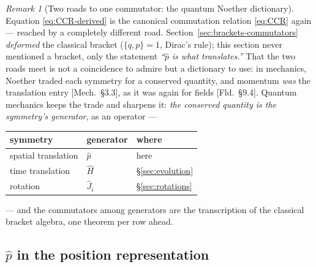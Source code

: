 \documentclass[11pt]{article}
\theoremstyle{plain}
\theoremstyle{definition}
\theoremstyle{remark}
\newtheorem{remark}[theorem]{Remark}
\newcommand{\op}[1]{\hat{#1}}
\begin{document}
\begin{remark}[Two roads to one commutator: the quantum Noether
dictionary]\label{rem:quantum-noether}
Equation \eqref{eq:CCR-derived} is the canonical commutation
relation \eqref{eq:CCR} again --- reached by a completely different
road. Section~\ref{sec:brackets-commutators} \emph{deformed} the
classical bracket ($\{q, p\} = 1$, Dirac's rule); this section never
mentioned a bracket, only the statement \emph{``$\op p$ is what
translates.''} That the two roads meet is not a coincidence to
admire but a dictionary to use: in mechanics, Noether traded each
symmetry for a conserved quantity, and momentum \emph{was} the
translation entry [Mech.\ \S3.3], as it was again for fields
[Fld.\ \S9.4]. Quantum mechanics keeps the trade and sharpens it:
\emph{the conserved quantity is the symmetry's generator}, as an
operator ---
\begin{center}
\begin{tabular}{lll}
\toprule
symmetry & generator & where \\
\midrule
spatial translation & $\op p$ & here \\
time translation & $\op H$ & \S\ref{sec:evolution} \\
rotation & $\op J_i$ & \S\ref{sec:rotations} \\
\bottomrule
\end{tabular}
\end{center}
--- and the commutators among generators are the transcription of
the classical bracket algebra, one theorem per row ahead.
\end{remark}

\subsection{$\op p$ in the position representation}
\label{sec:p-position-rep}
\end{document}
